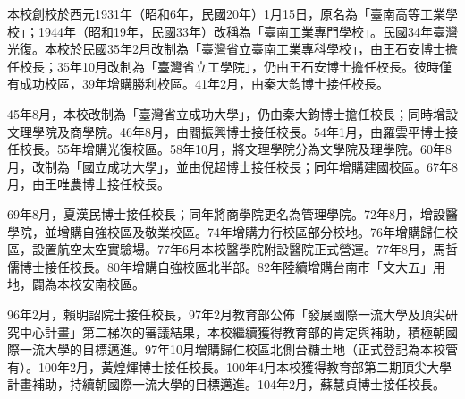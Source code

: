
本校創校於西元1931年（昭和6年，民國20年）1月15日，原名為「臺南高等工業學校」；1944年（昭和19年，民國33年）改稱為「臺南工業專門學校」。民國34年臺灣光復。本校於民國35年2月改制為「臺灣省立臺南工業專科學校」，由王石安博士擔任校長；35年10月改制為「臺灣省立工學院」，仍由王石安博士擔任校長。彼時僅有成功校區，39年增購勝利校區。41年2月，由秦大鈞博士接任校長。

45年8月，本校改制為「臺灣省立成功大學」，仍由秦大鈞博士擔任校長；同時增設文理學院及商學院。46年8月，由閻振興博士接任校長。54年1月，由羅雲平博士接任校長。55年增購光復校區。58年10月，將文理學院分為文學院及理學院。60年8月，改制為「國立成功大學」，並由倪超博士接任校長；同年增購建國校區。67年8月，由王唯農博士接任校長。

69年8月，夏漢民博士接任校長；同年將商學院更名為管理學院。72年8月，增設醫學院，並增購自強校區及敬業校區。74年增購力行校區部分校地。76年增購歸仁校區，設置航空太空實驗場。77年6月本校醫學院附設醫院正式營運。77年8月，馬哲儒博士接任校長。80年增購自強校區北半部。82年陸續增購台南市「文大五」用地，闢為本校安南校區。

96年2月，賴明詔院士接任校長，97年2月教育部公佈「發展國際一流大學及頂尖研究中心計畫」第二梯次的審議結果，本校繼續獲得教育部的肯定與補助，積極朝國際一流大學的目標邁進。97年10月增購歸仁校區北側台糖土地（正式登記為本校管有）。100年2月，黃煌煇博士接任校長。100年4月本校獲得教育部第二期頂尖大學計畫補助，持續朝國際一流大學的目標邁進。104年2月，蘇慧貞博士接任校長。




